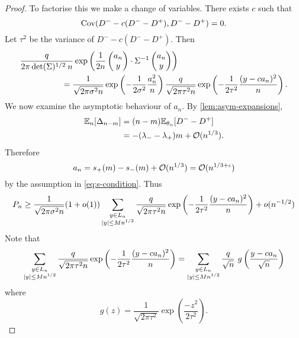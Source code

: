 \begin{proof}
    To factorise this we make a change of variables. There exists $c$ such that
    \begin{equation*}
        \operatorname{Cov}(D^- - c(D^- - D^+), D^- - D^+) = 0.
    \end{equation*}
    Let $\tau^2$ be the variance of $D^- - c(D^- - D^+)$. Then
    \begin{align*}
         &\frac{q}{2\pi \det(\Sigma)^{1/2} \: n} \exp\left( 
            \frac{1}{2n} \begin{pmatrix} a_n \\ y \end{pmatrix} \cdot \Sigma^{-1} \begin{pmatrix} a_n \\ y \end{pmatrix}
         \right) \nonumber \\
         & \hspace{5em} =
         \frac{1}{\sqrt{2 \pi \sigma^2 n}} \exp \left( - \frac{1}{2 \sigma^2} \frac{a_n^2}{n} \right)
         \frac{q}{\sqrt{2 \pi \tau^2 n}} \exp \left( - \frac{1}{2 \tau^2} \frac{(y - ca_n)^2}{n} \right).
    \end{align*}
    We now examine the asymptotic behaviour of $a_n$. By \cref{lem:asym-expansions},
    \begin{align*}
        {\mathbb E}_n[\Delta_{n-m}]
        &= (n - m) {\mathbb E}_{\theta_n}[D^- - D^+] \\ 
        &= -(\lambda_- - \lambda_+)m + \mathcal O(n^{1/3}).
    \end{align*}
    Therefore 
    \begin{equation*}
        a_n = s_+(m) - s_-(m) + \mathcal O(n^{1/3}) = \mathcal O(n^{1/3 + \epsilon})
    \end{equation*}
    by the assumption in \cref{eq:s-condition}. Thus
    \begin{equation*}
        P_n \geq
        \frac{1}{\sqrt{2 \pi \sigma^2 n}}(1 + o(1))
        \sum_{\substack{y \in L_n \\ \lvert y\rvert \leq M n^{1/2}}}
        \frac{q}{\sqrt{2 \pi \tau^2 n}} \exp \left( - \frac{1}{2 \tau^2} \frac{(y - ca_n)^2}{n} \right)
        + o(n^{-1/2})
    \end{equation*}
    Note that
    \begin{equation*}
        \sum_{\substack{y \in L_n \\ \lvert y\rvert \leq M n^{1/2}}}
        \frac{q}{\sqrt{2 \pi \tau^2 n}} \exp \left( - \frac{1}{2 \tau^2} \frac{(y - ca_n)^2}{n} \right)
        = \sum_{\substack{y \in L_n \\ \lvert y\rvert \leq M n^{1/2}}}
        \frac{q}{\sqrt{n}}\ g\left( \frac{y - ca_n}{\sqrt{n}} \right)
    \end{equation*}
    where
    \begin{equation*}
        g(z) = \frac{1}{\sqrt{2 \pi \tau^2}} \exp\left( \frac{-z^2}{2 \tau^2} \right).

\end{equation*}
\end{proof}
